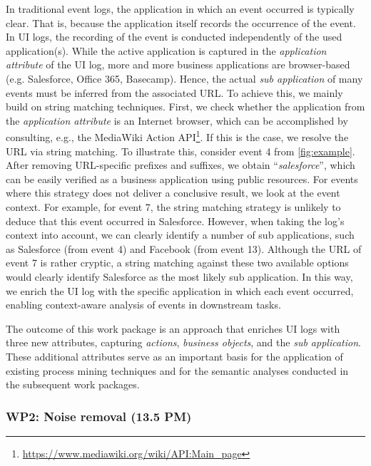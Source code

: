  In traditional event logs, the application in which an event occurred is typically clear. That is, because the application itself records the occurrence of the event. In UI logs, the recording of the event is conducted independently of the used application(s). While the active application is captured in the \textit{application attribute} of the UI log, more and more business applications are browser-based (e.g. Salesforce, Office 365, Basecamp). Hence, the actual \textit{sub application} of many events must be inferred from the associated URL. To achieve this, we mainly build on string matching techniques. First, we check whether the application from the \textit{application attribute} is an Internet browser, which can be accomplished by consulting, e.g., the 
MediaWiki Action API\footnote{\url{https://www.mediawiki.org/wiki/API:Main_page}}. If this is the case, we resolve the URL via string matching. To illustrate this, consider event 4 from \autoref{fig:example}. After removing URL-specific prefixes and suffixes, we obtain ``\textit{salesforce}'', which can be easily verified as a business application using public resources. For events where this strategy does not deliver a conclusive result, we look at the event context. For example, for event 7, the string matching strategy is unlikely to deduce that this event occurred in Salesforce. However, when taking the log's context into account, we can clearly identify a number of sub applications, such as Salesforce (from event 4) and Facebook (from event 13). Although the URL of event 7 is rather cryptic, a string matching against these two available options would clearly identify Salesforce as the most likely sub application. In this way, we enrich the UI log with the specific application in which each event occurred, enabling context-aware analysis of events in downstream tasks.

 The outcome of this work package is an approach that enriches UI logs with three new attributes, capturing \textit{actions}, \textit{business objects}, and the \textit{sub application}. These additional attributes serve as an important basis for the application of existing process mining techniques and for the semantic analyses conducted in the subsequent work packages.  


\subsubsection{WP2:  Noise removal (13.5 PM)}
\label{sec:wp2}

